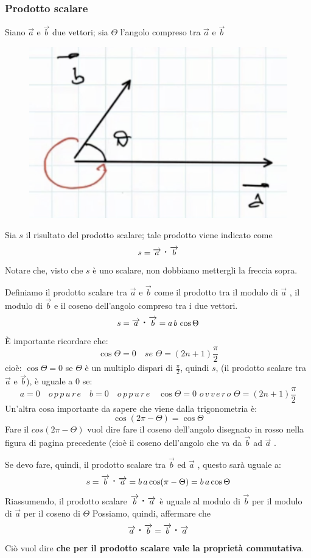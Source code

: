 \documentclass[a4paper]{book}
\newcommand{\prodscal}{\text{\large{\textbf{\textperiodcentered}}}} %
\begin{document}
\subsubsection{Prodotto scalare}
Siano $ \overrightarrow{a} $ e $ \overrightarrow{b} $ due vettori; sia $ \Theta $ l'angolo compreso tra $ \overrightarrow{a} $ e $ \overrightarrow{b} $

\begin{figure}[h]
\begin{center}
\includegraphics[width = 0.5 \textwidth]{scalare1}
\label{fig:scalare1}
\end{center}
\end{figure}

Sia $ s $ il risultato del prodotto scalare; tale prodotto viene indicato come
$$ s = \overrightarrow{a} \prodscal \overrightarrow{b} $$
Notare che, visto che $s$ è uno scalare, non dobbiamo mettergli la freccia sopra.

Definiamo il prodotto scalare tra $ \overrightarrow{a} $ e $\overrightarrow{b} $ come il prodotto tra il modulo di $\overrightarrow{a} $ , il modulo di $ \overrightarrow{b} $ e il coseno dell'angolo compreso tra i due vettori.
$$ s = \overrightarrow{a} \prodscal \overrightarrow{b} = a \, b \, \cos \Theta $$
È importante ricordare che:
$$ \cos \Theta = 0 \quad  se \, \,  \Theta = (2 n + 1) \frac{\pi}{2} $$
cioè: $ \cos \Theta = 0 $ se $ \Theta $ è un multiplo dispari di $ \frac{\pi}{2} $, quindi $s$, (il prodotto scalare tra $\overrightarrow{a}$ e $\overrightarrow{b}$), è uguale a 0 se:
$$ a = 0 \quad o\,p\,p\,u\,r\,e \quad b = 0 \quad o\,p\,p\,u\,r\,e \quad \cos \Theta = 0 \, \, o\,v\,v\,e\,r\,o \,\,\Theta = (2n+1) \frac{\pi}{2} $$
Un'altra cosa importante da sapere che viene dalla trigonometria è:
$$ \cos(2 \pi - \Theta) = \cos \Theta $$
Fare il $ cos(2 \pi - \Theta) $ vuol dire fare il coseno dell'angolo disegnato in rosso nella figura di pagina precedente (cioè il coseno dell'angolo che va da $\overrightarrow{b} $ ad $\overrightarrow{a} $ .

Se devo fare, quindi, il prodotto scalare tra $ \overrightarrow{b} $ ed $ \overrightarrow{a} $ , questo sarà uguale a:
$$ s = \overrightarrow{b} \prodscal \overrightarrow{a} = b\, a \cos(\pi - \Theta) = b \, a \cos \Theta $$
Riassumendo,  il prodotto scalare $\overrightarrow{b} \prodscal \overrightarrow{a} $ è uguale al modulo di $\overrightarrow{b}$ per il modulo di $ \overrightarrow{a} $ per il coseno di $ \Theta $
Possiamo, quindi,  affermare che
$$ \overrightarrow{a} \prodscal \overrightarrow{b} = \overrightarrow{b} \prodscal \overrightarrow{a} $$ 
Ciò vuol dire \textbf{che per il prodotto scalare vale la proprietà commutativa}.  \\
\end{document}
